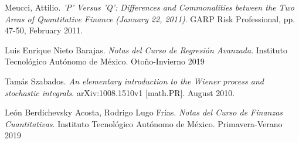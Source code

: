 \documentclass[12pt,reqno,a4paper]{article}
\begin{document}
	\begin{thebibliography}{1}

	Meucci, Attilio.
	\textit{'P' Versus 'Q': Differences and Commonalities between the Two Areas of Quantitative Finance (January 22, 2011)}. GARP Risk Professional, pp. 47-50, February 2011.
	
	Luis Enrique Nieto Barajas. \textit{Notas del Curso de Regresión Avanzada}. Instituto Tecnol\'ogico Aut\'onomo de M\'exico. Otoño-Invierno 2019
	
	Tam\'as Szabados. \textit{An elementary introduction to the Wiener process and stochastic integrals}.  arXiv:1008.1510v1 [math.PR]. August 2010.
	
	Le\'on Berdichevsky Acosta, Rodrigo Lugo Fr\'ias. \textit{Notas del Curso de Finanzas Cuantitativas}. Instituto Tecnol\'ogico Aut\'onomo de M\'exico. Primavera-Verano 2019
	\end{thebibliography}
\end{document}
